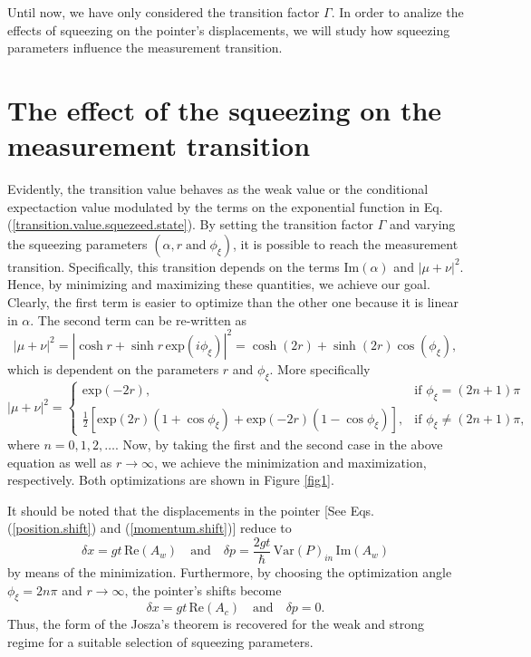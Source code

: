 \documentclass[aps,pra,preprint,superscriptaddress, showpacs]{revtex4-2}
\begin{document}
Until now, we have only considered the transition factor $\Gamma$. In order to analize the effects of squeezing on the pointer's displacements, we will study how squeezing parameters influence the measurement transition.

\section{\label{sec:formalism3}The effect of the squeezing on the measurement transition}

Evidently, the transition value behaves as the weak value or the conditional expectaction value modulated by the terms on the exponential function in Eq. (\ref{transition.value.squezeed.state}). By setting the transition factor $\Gamma$ and varying the squeezing parameters $\left(\alpha, r \; \text{and} \; \phi_{\xi}\right)$, it is possible to reach the measurement transition. Specifically, this transition depends on the terms $\textrm{Im}(\alpha)$ and $|\mu+\nu|^2$. Hence, by minimizing and maximizing these quantities, we achieve our goal. Clearly, the first term is easier to optimize than the other one because it is linear in $\alpha$. The second term can be re-written as
\begin{equation}
|\mu+\nu|^2= \left|\cosh{r}+\sinh{r}\,\textrm{exp}\left(i\phi_{\xi}\right)\right|^2=\cosh{(2r)}+\sinh{(2r)}\cos{(\phi_{\xi})},
\end{equation}
which is dependent on the parameters $r$ and $\phi_{\xi}$. 
More specifically
\begin{equation}
|\mu+\nu|^2 = \left\{\begin{array}{ll}
\textrm{exp}(-2r), & \text{if } \phi_{\xi}=(2n+1)\pi\\
\frac{1}{2}\left[\textrm{exp}(2r)\left(1+\cos\phi_{\xi}\right)+\textrm{exp}(-2r)\left(1-\cos\phi_{\xi}\right)\right],  & \text{if } \phi_{\xi}\neq (2n+1)\pi,
\end{array}
\right.
\end{equation}
where $n=0, 1, 2, \ldots$. Now, by taking the first and the second case in the above equation as well as $r \rightarrow \infty$, we achieve the minimization and maximization, respectively. Both optimizations are shown in Figure \ref{fig1}. 

It should be noted that the displacements in the pointer [See Eqs. (\ref{position.shift}) and (\ref{momentum.shift})] reduce to
\begin{equation}
\delta x=gt\,\textrm{Re}(A_{w})\quad\text{and}\quad\delta p=\frac{2gt}{\hbar}\,\textrm{Var}(P)_{in}\,\textrm{Im}(A_{w})
\end{equation}
by means of the minimization. Furthermore, by choosing the optimization angle $\phi_{\xi}=2n\pi$ and $r\rightarrow\infty$, the pointer's shifts become
\begin{equation}
\delta x=gt\,\textrm{Re}(A_{c})\quad\text{and}\quad\delta p=0.
\end{equation}
Thus, the form of the Josza's theorem is recovered for the weak and strong regime for a suitable selection of squeezing parameters.
\end{document}
